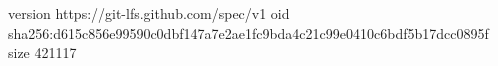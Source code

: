 version https://git-lfs.github.com/spec/v1
oid sha256:d615c856e99590c0dbf147a7e2ae1fc9bda4c21c99e0410c6bdf5b17dcc0895f
size 421117
